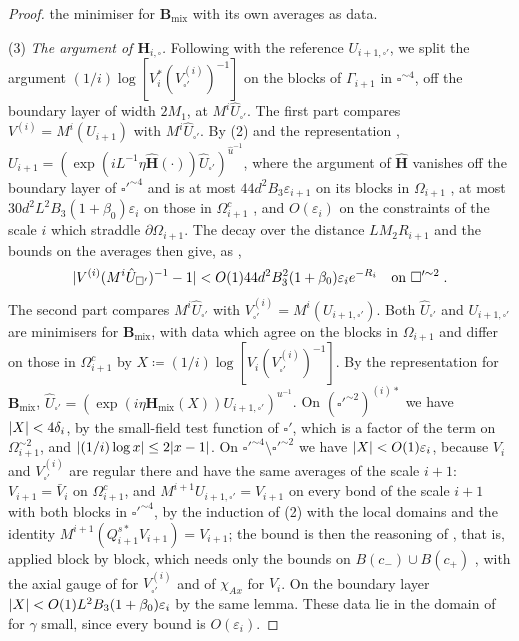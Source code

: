 \documentclass[11pt]{preprint}
\DeclarePairedDelimiter{\abs}{\lvert}{\rvert}
\numberwithin{equation}{section}
\theoremstyle{definition}
\theoremstyle{remark}
\theoremstyle{plain}
\begin{document}
\begin{proof}
the minimiser for $\mathbf B_{\mathrm{mix}}$ with its own averages as data.

(3) \emph{The argument of $\mathbf H_{i,\square}$.} Following \cite[(3.6)]{BalabanCRE} with the reference $U_{i+1,\square'}$, we split the argument $(1/i)\log[V^*_i(V^{(i)}_{\square'})^{-1}]$ on the blocks of $\Gamma_{i+1}$ in $\square^{\sim4}$, off the boundary layer of width $2M_1$, at $M^i\hat U_{\square'}$. The first part compares $V^{(i)} = M^i(U_{i+1})$ with $M^i\hat U_{\square'}$. By (2) and the representation \cite[Proposition~9, p.~309]{BalabanVAR}, $U_{i+1} = (\exp(iL^{-1}\eta\hat{\mathbf H}(\cdot))\hat U_{\square'})^{\hat u^{-1}}$, where the argument of $\hat{\mathbf H}$ vanishes off the boundary layer of $\square'^{\sim4}$ and is at most $44d^2B_3\varepsilon_{i+1}$ on its blocks in $\Omega_{i+1}$ \cite[p.~268]{BalabanCRE}, at most $30d^2L^2B_3(1 + \beta_0)\varepsilon_i$ on those in $\Omega_{i+1}^c$ \cite[p.~266]{BalabanCRE}, and $O(\varepsilon_i)$ on the constraints of the scale $i$ which straddle $\partial\Omega_{i+1}$. The decay \cite[(190), p.~308]{BalabanVAR} over the distance $LM_2R_{i+1}$ and the bounds \cite[(106)--(108), (159)--(163)]{BalabanAVG} on the averages then give, as \cite[(3.19)]{BalabanCRE},
\[
    \abs{V^{(i)}(M^i\hat U_{\square'})^{-1} - 1} < O(1)44d^2B_3^2(1 + \beta_0)\varepsilon_ie^{-R_i}
    \quad\text{on } \square'^{\sim2}\;.
\]
The second part compares $M^i\hat U_{\square'}$ with $V^{(i)}_{\square'} = M^i(U_{i+1,\square'})$. Both $\hat U_{\square'}$ and $U_{i+1,\square'}$ are minimisers for $\mathbf B_{\mathrm{mix}}$, with data which agree on the blocks in $\Omega_{i+1}$ and differ on those in $\Omega_{i+1}^c$ by $X \coloneqq (1/i)\log[V_i(V^{(i)}_{\square'})^{-1}]$. By the representation \cite[Proposition~9]{BalabanVAR} for $\mathbf B_{\mathrm{mix}}$, $\hat U_{\square'} = (\exp(i\eta\mathbf H_{\mathrm{mix}}(X))U_{i+1,\square'})^{u^{-1}}$. On $(\square'^{\sim2})^{(i)*}$ we have $\abs{X} < 4\delta_i$, by the small-field test function \cite[(3.3)]{BalabanCRE} of $\square'$, which is a factor of the term on $\Omega_{i+1}^{\sim2}$, and $\abs{(1/i)\log x} \leq 2\abs{x - 1}$. On $\square'^{\sim4} \setminus \square'^{\sim2}$ we have $\abs{X} < O(1)\varepsilon_i$, because $V_i$ and $V^{(i)}_{\square'}$ are regular there and have the same averages of the scale $i + 1$: $V_{i+1} = \bar V_i$ on $\Omega_{i+1}^c$, and $M^{i+1}U_{i+1,\square'} = V_{i+1}$ on every bond of the scale $i + 1$ with both blocks in $\square'^{\sim4}$, by the induction of (2) with the local domains and the identity $M^{i+1}(Q^{s*}_{i+1}V_{i+1}) = V_{i+1}$; the bound is then the reasoning of \cite[(1.65), p.~87]{BalabanREG}, that is, \cite[Lemma~1, (1.24)--(1.25), p.~79]{BalabanREG} applied block by block, which needs only the bounds on $B(c_-) \cup B(c_+)$ \cite[p.~80]{BalabanREG}, with the axial gauge of \cite[(3.9)]{BalabanCRE} for $V^{(i)}_{\square'}$ and of $\chi_{Ax}$ for $V_i$. On the boundary layer $\abs{X} < O(1)L^2B_3(1 + \beta_0)\varepsilon_i$ by the same lemma. These data lie in the domain of \cite[Proposition~9]{BalabanVAR} for $\gamma$ small, since every bound is $O(\varepsilon_i)$.


\end{proof}
\end{document}
